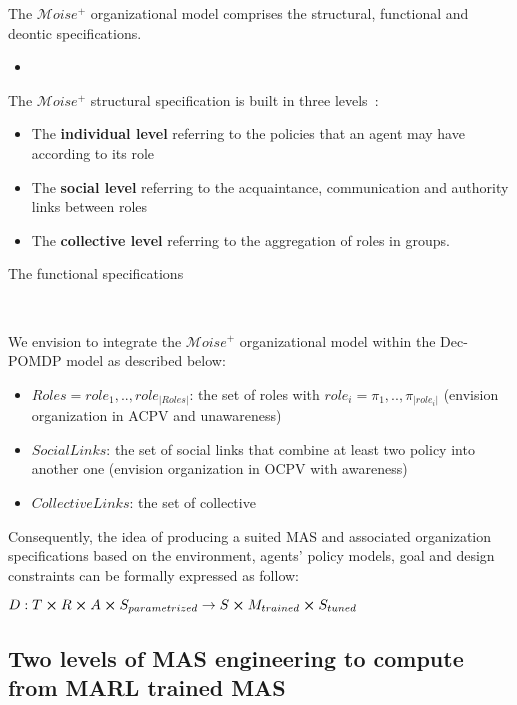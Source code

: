 \documentclass[runningheads]{llncs}
\begin{document}
The $\mathcal{M}oise^{+}$ organizational model comprises the structural, functional and deontic specifications.

\begin{itemize}
    \item 
\end{itemize}

The $\mathcal{M}oise^{+}$ structural specification is built in three levels~\cite{Hubner2007}:
\begin{itemize}
    \item The \textbf{individual level} referring to the policies that an agent may have according to its role
    \item The \textbf{social level} referring to the acquaintance, communication and authority links between roles
    \item The \textbf{collective level} referring to the aggregation of roles in groups.
\end{itemize}

The functional specifications

\ 

We envision to integrate the $\mathcal{M}oise^{+}$ organizational model within the Dec-POMDP model as described below:

\begin{itemize}
    \item $Roles = {role_1,..,role_{|Roles|}}$: the set of roles with $role_i = {\pi_1,..,\pi_{|role_i|}}$ (envision organization in ACPV and unawareness)
    \item $SocialLinks$: the set of social links that combine at least two policy into another one (envision organization in OCPV with awareness)
    \item $CollectiveLinks$: the set of collective 
\end{itemize}


Consequently, the idea of producing a suited MAS and associated organization specifications based on the environment, agents' policy models, goal and design constraints can be formally expressed as follow:


$D: T \cross R \cross A \cross S_{parametrized} \rightarrow S \cross M_{trained} \cross S_{tuned}$


\subsection{Two levels of MAS engineering to compute from MARL trained MAS}
\end{document}
